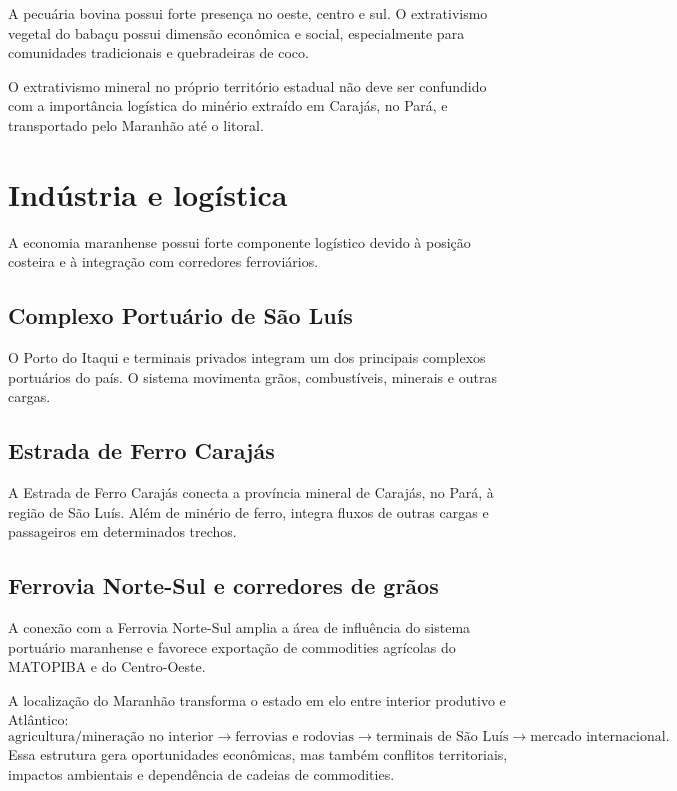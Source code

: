 A pecuária bovina possui forte presença no oeste, centro e sul. O extrativismo vegetal do babaçu possui dimensão econômica e social, especialmente para comunidades tradicionais e quebradeiras de coco.

O extrativismo mineral no próprio território estadual não deve ser confundido com a importância logística do minério extraído em Carajás, no Pará, e transportado pelo Maranhão até o litoral.

\section{Indústria e logística}

A economia maranhense possui forte componente logístico devido à posição costeira e à integração com corredores ferroviários.

\subsection{Complexo Portuário de São Luís}

O Porto do Itaqui e terminais privados integram um dos principais complexos portuários do país. O sistema movimenta grãos, combustíveis, minerais e outras cargas.

\subsection{Estrada de Ferro Carajás}

A Estrada de Ferro Carajás conecta a província mineral de Carajás, no Pará, à região de São Luís. Além de minério de ferro, integra fluxos de outras cargas e passageiros em determinados trechos.

\subsection{Ferrovia Norte-Sul e corredores de grãos}

A conexão com a Ferrovia Norte-Sul amplia a área de influência do sistema portuário maranhense e favorece exportação de commodities agrícolas do MATOPIBA e do Centro-Oeste.

\begin{teoria}
A localização do Maranhão transforma o estado em elo entre interior produtivo e Atlântico:
\[
\text{agricultura/mineração no interior}
\rightarrow
\text{ferrovias e rodovias}
\rightarrow
\text{terminais de São Luís}
\rightarrow
\text{mercado internacional}.
\]
Essa estrutura gera oportunidades econômicas, mas também conflitos territoriais, impactos ambientais e dependência de cadeias de commodities.
\end{teoria}


